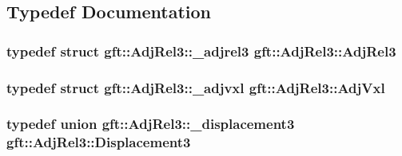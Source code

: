 \subsection{Typedef Documentation}
\hypertarget{namespacegft_1_1AdjRel3_a0d54e2f148bf5636f3a3faf70d4eb5ae}{
\subsubsection[{Adj\-Rel3}]{\setlength{\rightskip}{0pt plus 5cm}typedef struct {\bf gft\-::\-Adj\-Rel3\-::\-\_\-adjrel3}  {\bf gft\-::\-Adj\-Rel3\-::\-Adj\-Rel3}}}\label{namespacegft_1_1AdjRel3_a0d54e2f148bf5636f3a3faf70d4eb5ae}
\hypertarget{namespacegft_1_1AdjRel3_af816b2f50a2bbe691cddc961d58b16da}{
\subsubsection[{Adj\-Vxl}]{\setlength{\rightskip}{0pt plus 5cm}typedef struct {\bf gft\-::\-Adj\-Rel3\-::\-\_\-adjvxl}  {\bf gft\-::\-Adj\-Rel3\-::\-Adj\-Vxl}}}\label{namespacegft_1_1AdjRel3_af816b2f50a2bbe691cddc961d58b16da}
\hypertarget{namespacegft_1_1AdjRel3_a8939e0d3e5e0afd8c4e28e4b400de74e}{
\subsubsection[{Displacement3}]{\setlength{\rightskip}{0pt plus 5cm}typedef union {\bf gft\-::\-Adj\-Rel3\-::\-\_\-displacement3}  {\bf gft\-::\-Adj\-Rel3\-::\-Displacement3}}}\label{namespacegft_1_1AdjRel3_a8939e0d3e5e0afd8c4e28e4b400de74e}


